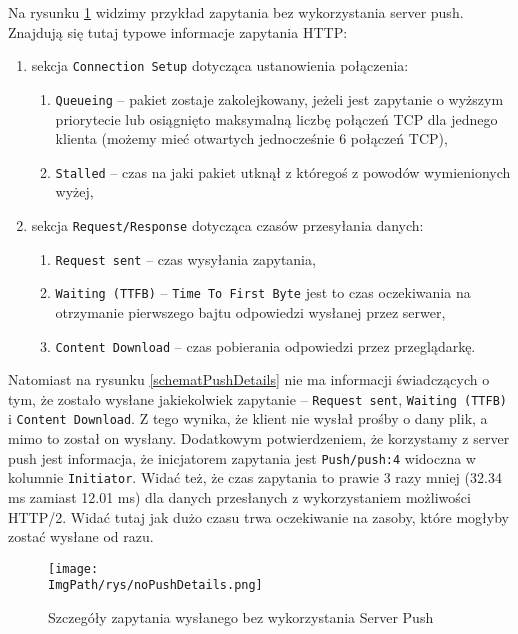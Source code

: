 \documentclass[a4paper,12pt,twoside,openany]{report}
\newcommand{\ImgPath}{.}
\begin{document}
Na rysunku \ref{schematNoPushDetails} widzimy przykład zapytania bez wykorzystania server push.
Znajdują się tutaj typowe informacje zapytania HTTP:
\begin{enumerate}
	\item sekcja \texttt{Connection Setup} dotycząca ustanowienia połączenia:
	\begin{enumerate}
		\item \texttt{Queueing} -- pakiet zostaje zakolejkowany, jeżeli jest zapytanie o wyższym priorytecie lub osiągnięto maksymalną liczbę połączeń TCP dla jednego klienta (możemy mieć otwartych jednocześnie 6 połączeń TCP),
		\item \texttt{Stalled} -- czas na jaki pakiet utknął z któregoś z powodów wymienionych wyżej,
	\end{enumerate}
	\item sekcja \texttt{Request/Response} dotycząca czasów przesyłania danych:
	\begin{enumerate}
		\item \texttt{Request sent} -- czas wysyłania zapytania,
		\item \texttt{Waiting (TTFB)} -- \texttt{Time To First Byte} jest to czas oczekiwania na otrzymanie pierwszego bajtu odpowiedzi wysłanej przez serwer,
		\item \texttt{Content Download} -- czas pobierania odpowiedzi przez przeglądarkę.
	\end{enumerate}
\end{enumerate}
Natomiast na rysunku \ref{schematPushDetails} nie ma informacji świadczących o tym, że zostało wysłane jakiekolwiek zapytanie -- \texttt{Request sent}, \texttt{Waiting (TTFB)} i \texttt{Content Download}.
Z tego wynika, że klient nie wysłał prośby o dany plik, a mimo to został on wysłany.
Dodatkowym potwierdzeniem, że korzystamy z server push jest informacja, że inicjatorem zapytania jest \texttt{Push/push:4} widoczna w kolumnie \texttt{Initiator}.
Widać też, że czas zapytania to prawie 3 razy mniej (32.34 ms zamiast 12.01 ms) dla danych przesłanych z wykorzystaniem możliwości HTTP/2.
Widać tutaj jak dużo czasu trwa oczekiwanie na zasoby, które mogłyby zostać wysłane od razu.

\begin{figure}[!htbp]
	\begin{center}
\centering
\texttt{[image: \\ImgPath/rys/noPushDetails.png]}
\end{center}
	\caption{Szczegóły zapytania wysłanego bez wykorzystania Server Push}
	\label{schematNoPushDetails}
\end{figure}
\end{document}
